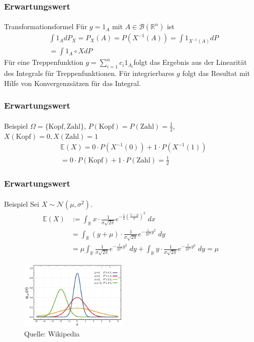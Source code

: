 \documentclass{beamer}
\begin{document}
\begin{frame}
    \frametitle{Erwartungswert}
\framesubtitle{}
\begin{block}{Transformationsformel}
Für $g = 1_A$ mit $A \in \mathcal{B}(\mathbb{R}^n)$ ist
\begin{align*}
& \int 1_A dP_X = P_X(A) = P(X^{-1} (A)) = \int 1_{X^{-1}(A)} dP \\
&= \int 1_{A} \circ X dP
\end{align*}
Für eine Treppenfunktion $g= \sum_{i= 1}^n c_i 1_{A_i} $folgt das Ergebnis aus der Linearität des Integrals  für Treppenfunktionen. Für integrierbares $g$ folgt das Resultat mit Hilfe von Konvergenzsätzen für das  Integral.
\end{block}
 \end{frame}

\begin{frame}
    \frametitle{Erwartungswert}
\framesubtitle{}
\begin{block}{Beispiel}
$\Omega = \{ \text{Kopf},\text{Zahl}\}$, $P(\text{Kopf}) = P(\text{Zahl}) = \frac{1}{2}$, $X(\text{Kopf}) = 0,  X(\text{Zahl}) = 1$ 
\begin{align*}
& \mathbb{E}(X)  = 0 \cdot P(X^{-1}(0) ) + 1 \cdot P(X^{-1}(1)) \\
& =0  \cdot P(\text{Kopf}) + 1 \cdot P(\text{Zahl}) = \frac{1}{2}  
\end{align*}
\end{block}
 \end{frame}



\begin{frame}
    \frametitle{Erwartungswert}
\framesubtitle{}
\begin{block}{Beispiel}
Sei $X \sim \mathcal{N}(\mu, \sigma^2)$.
\begin{align*}
\mathbb{E}(X) & := \int_{\mathbb{R}}  x \cdot  \frac 1{\sigma \sqrt{2\pi}}e^{- \frac {1}{2 } (\frac{x- \mu}{ \sigma})^2} \; dx  \\
&= \int_{\mathbb{R}}  (y + \mu) \cdot  \frac 1{\sigma \sqrt{2\pi}}e^{- \frac {1}{2 \sigma^2} y^2} \; dy \\
 &  = \mu  \int_{\mathbb{R}}      \frac 1{\sigma \sqrt{2\pi}}e^{- \frac {1}{2 \sigma^2} y^2} \; dy  + \int_{\mathbb{R}}  y  \cdot  \frac 1{\sigma \sqrt{2\pi}}e^{- \frac {1}{2 \sigma^2} y^2} \; dy = \mu
\end{align*}
\end{block}
\begin{figure}[htp]
      \centering
    \includegraphics[width=0.46\textwidth]{img/normal}
      \caption{Quelle: Wikipedia}
\end{figure}
 \end{frame}
\end{document}
